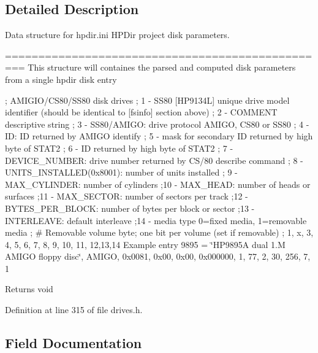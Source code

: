 \subsection{Detailed Description}
Data structure for hpdir.\+ini H\+P\+Dir project disk parameters. 

================================================= This structure will containes the parsed and computed disk parameters from a single hpdir disk entry

; A\+M\+I\+G\+I\+O/\+C\+S80/\+S\+S80 disk drives ; 1 -\/ S\+S80 \mbox{[}H\+P9134L\mbox{]} unique drive model identifier (should be identical to \mbox{[}fsinfo\mbox{]} section above) ; 2 -\/ C\+O\+M\+M\+E\+NT descriptive string ; 3 -\/ S\+S80/\+A\+M\+I\+GO\+: drive protocol A\+M\+I\+GO, C\+S80 or S\+S80 ; 4 -\/ ID\+: ID returned by A\+M\+I\+GO identify ; 5 -\/ mask for secondary ID returned by high byte of S\+T\+A\+T2 ; 6 -\/ ID returned by high byte of S\+T\+A\+T2 ; 7 -\/ D\+E\+V\+I\+C\+E\+\_\+\+N\+U\+M\+B\+ER\+: drive number returned by C\+S/80 describe command ; 8 -\/ U\+N\+I\+T\+S\+\_\+\+I\+N\+S\+T\+A\+L\+L\+E\+D(0x8001)\+: number of units installed ; 9 -\/ M\+A\+X\+\_\+\+C\+Y\+L\+I\+N\+D\+ER\+: number of cylinders ;10 -\/ M\+A\+X\+\_\+\+H\+E\+AD\+: number of heads or surfaces ;11 -\/ M\+A\+X\+\_\+\+S\+E\+C\+T\+OR\+: number of sectors per track ;12 -\/ B\+Y\+T\+E\+S\+\_\+\+P\+E\+R\+\_\+\+B\+L\+O\+CK\+: number of bytes per block or sector ;13 -\/ I\+N\+T\+E\+R\+L\+E\+A\+VE\+: default interleave ;14 -\/ media type 0=fixed media, 1=removable media ; \# Removable volume byte; one bit per volume (set if removable) ; 1, x, 3, 4, 5, 6, 7, 8, 9, 10, 11, 12,13,14 Example entry 9895 = \char`\"{}\+H\+P9895\+A dual 1.\+M A\+M\+I\+G\+O floppy disc\char`\"{}, A\+M\+I\+GO, 0x0081, 0x00, 0x00, 0x000000, 1, 77, 2, 30, 256, 7, 1

\begin{DoxyReturn}{Returns}
void 
\end{DoxyReturn}


Definition at line 315 of file drives.\+h.



\subsection{Field Documentation}
\mbox{\label{structhpdir__t_a4b4f32c9b9cfe558ce5fbd51d65b5db3}} 
